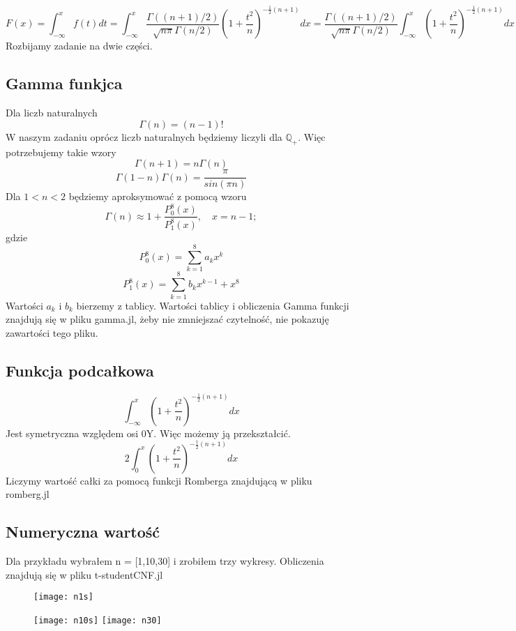 \documentclass[12pt]{article}
\begin{document}
$$F(x) = \int_{-\infty}^{x}f(t)dt =
 \int_{-\infty}^{x} \frac{\Gamma((n+1)/2)}{\sqrt{n\pi}\Gamma(n/2)}(1+\frac{t^2}{n})^{-\frac{1}{2}(n+1)}dx = 
  \frac{\Gamma((n+1)/2)}{\sqrt{n\pi}\Gamma(n/2)}\int_{-\infty}^{x} (1+\frac{t^2}{n})^{-\frac{1}{2}(n+1)}dx$$
  Rozbijamy zadanie na dwie części.
\subsection*{Gamma funkjca}
Dla liczb naturalnych
$$ \Gamma(n)=(n-1)!$$
W naszym zadaniu oprócz liczb naturalnych będziemy liczyli dla  $\mathbb {Q_{+}}$. Więc potrzebujemy takie wzory
$$ \Gamma (n+1) = n\Gamma(n) $$
$$ \Gamma (1-n)\Gamma(n) = \frac{\pi}{sin(\pi n)} $$
Dla $1<n<2$ będziemy aproksymować z pomocą wzoru
$$ \Gamma(n) \approx 1 + \frac{P_{0}^8(x)}{P_{1}^8(x)}, \quad
x = n-1; $$
gdzie 
	$$P_{0}^8(x)= \sum_{k=1}^{8}a_{k}x^k $$
	$$P_{1}^8(x)= \sum_{k=1}^{8}b_{k}x^{k-1}+x^8 $$
Wartości $a_k$ i $b_k$ bierzemy z tablicy. Wartości tablicy i obliczenia Gamma funkcji znajdują się w pliku gamma.jl, żeby nie zmniejszać czytelność, nie pokazuję zawartości tego pliku.
\subsection*{Funkcja podcałkowa}
$$ \int_{-\infty}^{x} (1+\frac{t^2}{n})^{-\frac{1}{2}(n+1)}dx $$
Jest symetryczna względem osi 0Y. Więc możemy ją przekształcić.
$$ 2\int_{0}^{x} (1+\frac{t^2}{n})^{-\frac{1}{2}(n+1)}dx $$
Liczymy wartość całki za pomocą funkcji Romberga znajdującą w pliku romberg.jl
\subsection*{Numeryczna wartość}
Dla przykładu wybrałem n = [1,10,30] i zrobiłem trzy wykresy.
Obliczenia znajdują się w pliku t-studentCNF.jl
\begin{figure}[hbt!]
 \centering
 \texttt{[image: n1s]}
\end{figure}
\begin{figure}[hbt!]
 \centering
 \texttt{[image: n10s]}
 \texttt{[image: n30]}
\end{figure}
\end{document}
